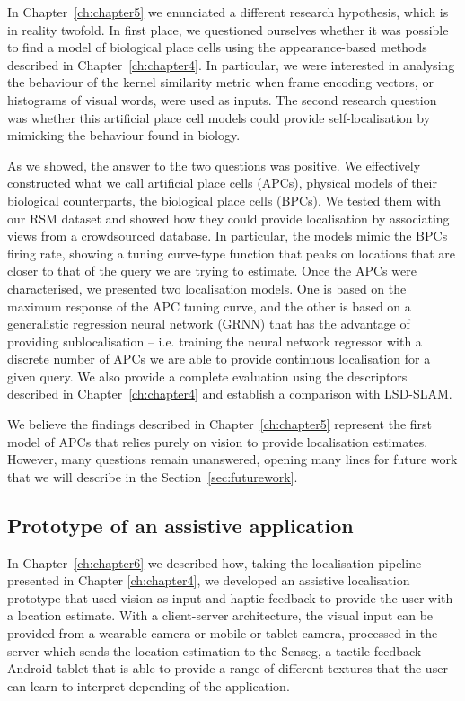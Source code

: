 In Chapter~\ref{ch:chapter5} we enunciated a different research hypothesis, which is in reality twofold. In first place, we questioned ourselves whether it was possible to find  a model of biological place cells using the appearance-based methods described in Chapter~\ref{ch:chapter4}. In particular, we were interested in analysing the behaviour of the kernel similarity metric when frame encoding vectors, or histograms of visual words, were used as inputs. The second research question was whether this artificial place cell models could provide self-localisation by mimicking the behaviour found in biology.

As we showed, the answer to the two questions was positive. We effectively constructed what we call artificial place cells (APCs), physical models of their biological counterparts, the biological place cells (BPCs). We tested them with our RSM dataset and showed how they could provide localisation by associating views from a crowdsourced database. In particular, the models mimic the BPCs firing rate, showing a tuning curve-type function that peaks on locations that are closer to that of the query we are trying to estimate. Once the APCs were characterised, we presented two localisation models. One is based on the maximum response of the APC tuning curve, and the other is based on a generalistic regression neural network (GRNN) that has the advantage of providing sublocalisation -- i.e. training the neural network regressor with a discrete number of APCs we are able to provide continuous localisation for a given query. We also provide a complete evaluation using the descriptors described in Chapter~\ref{ch:chapter4} and establish a comparison with LSD-SLAM.

We believe the findings described in Chapter~\ref{ch:chapter5} represent the first model of APCs that relies purely on vision to provide localisation estimates. However, many questions remain unanswered, opening many lines for future work that we will describe in the Section~\ref{sec:futurework}. 

\subsection{Prototype of an assistive application}

In Chapter~\ref{ch:chapter6} we described how, taking the localisation pipeline presented in Chapter \ref{ch:chapter4}, we developed an assistive localisation prototype that used vision as input and haptic feedback to provide the user with a location estimate. With a client-server architecture, the visual input can be provided from a wearable camera or mobile or tablet camera, processed in the server which sends the location estimation to the Senseg\texttrademark, a tactile feedback Android tablet that is able to provide a range of different textures that the user can learn to interpret depending of the application.


